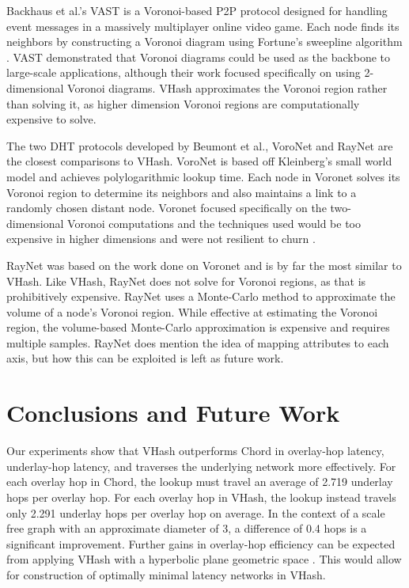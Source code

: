 \documentclass[10pt, conference, letterpaper]{IEEEtran}
\begin{document}
Backhaus et al.'s  VAST \cite{Backhaus:2007:VAS:1326257.1326266} is a Voronoi-based P2P protocol designed for handling event messages in a massively multiplayer online video game.  
Each node finds its neighbors by constructing a Voronoi diagram using Fortune's sweepline algorithm \cite{fortune1987sweepline}.  
VAST demonstrated that Voronoi diagrams could be used as the backbone to large-scale applications, although their work focused specifically on using 2-dimensional Voronoi diagrams.  
VHash approximates the Voronoi region rather than solving it, as higher dimension Voronoi regions are computationally expensive to solve.

The two DHT protocols developed by Beumont et al., VoroNet \cite{voronet} and RayNet \cite{raynet} are the closest comparisons to VHash.
VoroNet is based off Kleinberg's small world model \cite{kleinberg2000navigation} and achieves polylogarithmic lookup time.  
Each node in Voronet solves its Voronoi region to determine its neighbors and also maintains a link to a randomly chosen distant node.
Voronet focused specifically on the two-dimensional Voronoi computations and the techniques used would be too expensive in higher dimensions and were not resilient to churn  \cite{raynet}.

RayNet \cite{raynet} was based on the work done on Voronet and is by far the most similar to VHash.  
Like VHash, RayNet does not solve for Voronoi regions, as that is prohibitively expensive.  
RayNet uses a Monte-Carlo method to approximate the volume of a node's Voronoi region.  
While effective at estimating the Voronoi region,  the volume-based Monte-Carlo approximation is expensive and requires multiple samples. 
RayNet does mention the idea of mapping attributes to each axis, but how this can be exploited is left as future work.
 

\section{Conclusions and Future Work}
\label{conclusions}
Our experiments show that VHash outperforms Chord in overlay-hop latency, underlay-hop latency, and traverses the underlying network more effectively. 
For each overlay hop in Chord, the lookup must travel an average of 2.719 underlay hops per overlay hop.
For each overlay hop in VHash, the lookup instead travels only 2.291 underlay hops per overlay hop on average.
In the context of a scale free graph with an approximate diameter of 3, a difference of 0.4 hops is a significant improvement. 
Further gains in overlay-hop efficiency can be expected from applying VHash with a hyperbolic plane geometric space \cite{papadopoulos2010greedy}.
This would allow for construction of optimally minimal latency networks in VHash.
\end{document}
